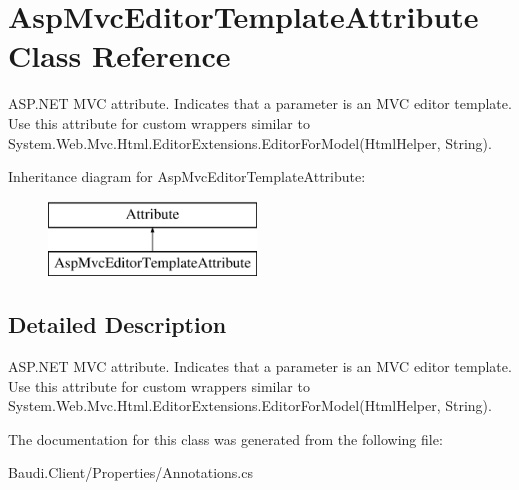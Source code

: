 \hypertarget{class_asp_mvc_editor_template_attribute}{}\section{Asp\+Mvc\+Editor\+Template\+Attribute Class Reference}
\label{class_asp_mvc_editor_template_attribute}


A\+S\+P.\+N\+E\+T M\+V\+C attribute. Indicates that a parameter is an M\+V\+C editor template. Use this attribute for custom wrappers similar to {\ttfamily System.\+Web.\+Mvc.\+Html.\+Editor\+Extensions.\+Editor\+For\+Model(\+Html\+Helper, String)}.  


Inheritance diagram for Asp\+Mvc\+Editor\+Template\+Attribute\+:\begin{figure}[H]
\begin{center}
\leavevmode
\includegraphics[height=2.000000cm]{class_asp_mvc_editor_template_attribute}
\end{center}
\end{figure}


\subsection{Detailed Description}
A\+S\+P.\+N\+E\+T M\+V\+C attribute. Indicates that a parameter is an M\+V\+C editor template. Use this attribute for custom wrappers similar to {\ttfamily System.\+Web.\+Mvc.\+Html.\+Editor\+Extensions.\+Editor\+For\+Model(\+Html\+Helper, String)}. 



The documentation for this class was generated from the following file\+:\begin{DoxyCompactItemize}
\item 
Baudi.\+Client/\+Properties/Annotations.\+cs\end{DoxyCompactItemize}
